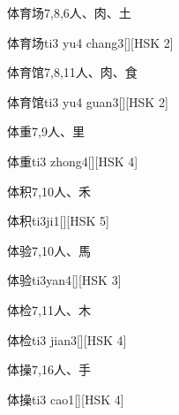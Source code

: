 \begin{entry}{体育场}{7,8,6}{⼈、⾁、⼟}
  \begin{phonetics}{体育场}{ti3 yu4 chang3}[][HSK 2]
  \end{phonetics}
\end{entry}

\begin{entry}{体育馆}{7,8,11}{⼈、⾁、⾷}
  \begin{phonetics}{体育馆}{ti3 yu4 guan3}[][HSK 2]
  \end{phonetics}
\end{entry}

\begin{entry}{体重}{7,9}{⼈、⾥}
  \begin{phonetics}{体重}{ti3 zhong4}[][HSK 4]
  \end{phonetics}
\end{entry}

\begin{entry}{体积}{7,10}{⼈、⽲}
  \begin{phonetics}{体积}{ti3ji1}[][HSK 5]
  \end{phonetics}
\end{entry}

\begin{entry}{体验}{7,10}{⼈、⾺}
  \begin{phonetics}{体验}{ti3yan4}[][HSK 3]
  \end{phonetics}
\end{entry}

\begin{entry}{体检}{7,11}{⼈、⽊}
  \begin{phonetics}{体检}{ti3 jian3}[][HSK 4]
  \end{phonetics}
\end{entry}

\begin{entry}{体操}{7,16}{⼈、⼿}
  \begin{phonetics}{体操}{ti3 cao1}[][HSK 4]
  \end{phonetics}
\end{entry}

